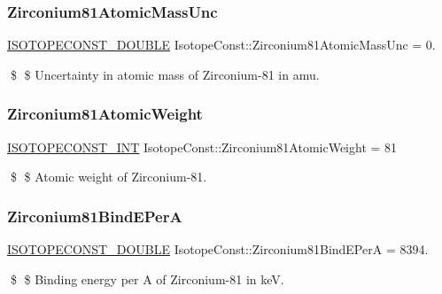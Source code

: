 \subsubsection{\texorpdfstring{Zirconium81\+Atomic\+Mass\+Unc}{Zirconium81AtomicMassUnc}}
{\footnotesize\ttfamily \mbox{\hyperlink{group___isotope_const-_macros_ga8f45a7272ce02c0b4c65c44636ed719a}{I\+S\+O\+T\+O\+P\+E\+C\+O\+N\+S\+T\+\_\+\+D\+O\+U\+B\+LE}} Isotope\+Const\+::\+Zirconium81\+Atomic\+Mass\+Unc = 0.}

\$ \$ Uncertainty in atomic mass of Zirconium-\/81 in amu. \mbox{\label{group___isotope_const-_zirconium-_zr81_ga1288d7322ccb181bd0b09d883ac37a4d}} 
\subsubsection{\texorpdfstring{Zirconium81\+Atomic\+Weight}{Zirconium81AtomicWeight}}
{\footnotesize\ttfamily \mbox{\hyperlink{group___isotope_const-_macros_ga5f18360b3e99483a35c32d789e62621c}{I\+S\+O\+T\+O\+P\+E\+C\+O\+N\+S\+T\+\_\+\+I\+NT}} Isotope\+Const\+::\+Zirconium81\+Atomic\+Weight = 81}

\$ \$ Atomic weight of Zirconium-\/81. \mbox{\label{group___isotope_const-_zirconium-_zr81_gac49efe1f4be0abf13103f1ba86bf77c1}} 
\subsubsection{\texorpdfstring{Zirconium81\+Bind\+E\+PerA}{Zirconium81BindEPerA}}
{\footnotesize\ttfamily \mbox{\hyperlink{group___isotope_const-_macros_ga8f45a7272ce02c0b4c65c44636ed719a}{I\+S\+O\+T\+O\+P\+E\+C\+O\+N\+S\+T\+\_\+\+D\+O\+U\+B\+LE}} Isotope\+Const\+::\+Zirconium81\+Bind\+E\+PerA = 8394.}

\$ \$ Binding energy per A of Zirconium-\/81 in keV. \mbox{\label{group___isotope_const-_zirconium-_zr81_gac226c20efdf181e8f6d833911856eed1}} 
